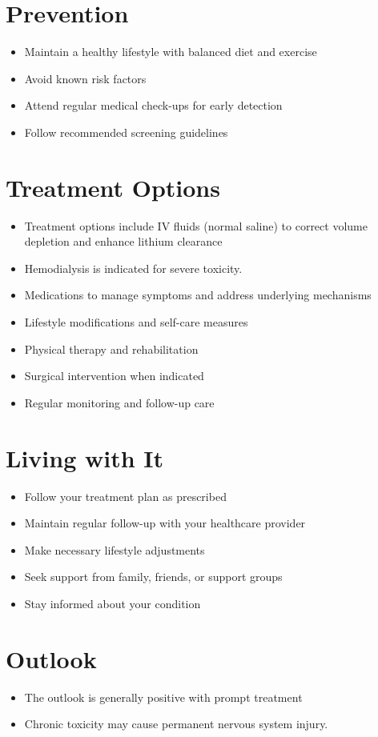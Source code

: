 \section{Prevention}
\begin{itemize}[noitemsep]
  \item Maintain a healthy lifestyle with balanced diet and exercise
  \item Avoid known risk factors
  \item Attend regular medical check-ups for early detection
  \item Follow recommended screening guidelines
\end{itemize}
\section{Treatment Options}
\begin{itemize}[noitemsep]
  \item Treatment options include IV fluids (normal saline) to correct volume depletion and enhance lithium clearance
  \item Hemodialysis is indicated for severe toxicity.
  \item Medications to manage symptoms and address underlying mechanisms
  \item Lifestyle modifications and self-care measures
  \item Physical therapy and rehabilitation
  \item Surgical intervention when indicated
  \item Regular monitoring and follow-up care
\end{itemize}
\section{Living with It}
\begin{itemize}[noitemsep]
  \item Follow your treatment plan as prescribed
  \item Maintain regular follow-up with your healthcare provider
  \item Make necessary lifestyle adjustments
  \item Seek support from family, friends, or support groups
  \item Stay informed about your condition
\end{itemize}
\section{Outlook}
\begin{itemize}[noitemsep]
  \item The outlook is generally positive with prompt treatment
  \item Chronic toxicity may cause permanent nervous system injury.
\end{itemize}
